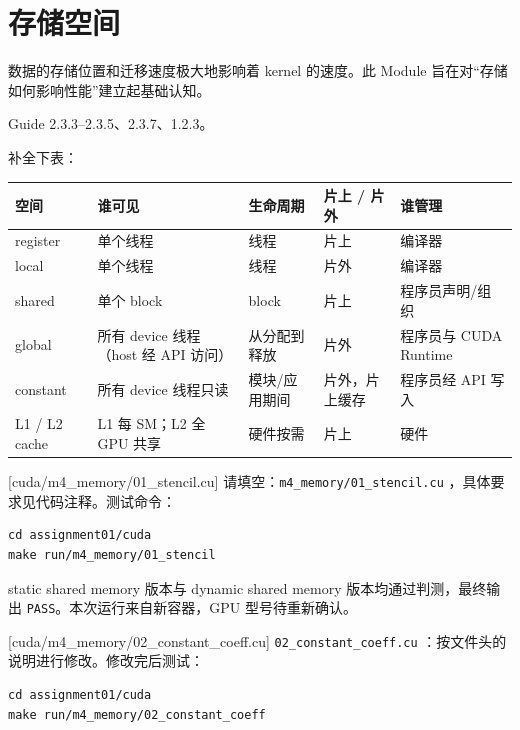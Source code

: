 \documentclass[11pt,a4paper,fontset=none]{ctexart}
\begin{document}
\section{存储空间}

数据的存储位置和迁移速度极大地影响着 kernel 的速度。此 Module 旨在对“存储如何影响性能”建立起基础认知。

\begin{reading}
Guide 2.3.3--2.3.5、2.3.7、1.2.3。
\end{reading}

补全下表：

\begin{center}\small
\begin{tabular}{@{}lp{8em}p{7em}p{6em}p{8em}@{}}
\toprule
空间 & 谁可见 & 生命周期 & 片上 / 片外 & 谁管理 \\
\midrule
register & 单个线程 & 线程 & 片上 & 编译器 \\
local & 单个线程 & 线程 & 片外 & 编译器 \\
shared & 单个 block & block & 片上 & 程序员声明/组织 \\
global & 所有 device 线程（host 经 API 访问） & 从分配到释放 & 片外 & 程序员与 CUDA Runtime \\
constant & 所有 device 线程只读 & 模块/应用期间 & 片外，片上缓存 & 程序员经 API 写入 \\
L1 / L2 cache & L1 每 SM；L2 全 GPU 共享 & 硬件按需 & 片上 & 硬件 \\
\bottomrule
\end{tabular}
\end{center}

[cuda/m4\_memory/01\_stencil.cu]
请填空：\texttt{m4\_memory/01\_stencil.cu} ，具体要求见代码注释。测试命令：

\begin{lstlisting}
cd assignment01/cuda
make run/m4_memory/01_stencil
\end{lstlisting}

\begin{tcolorbox}[title={4.2 判测记录}]
static shared memory 版本与 dynamic shared memory 版本均通过判测，最终输出 \texttt{PASS}。本次运行来自新容器，GPU 型号待重新确认。
\end{tcolorbox}

[cuda/m4\_memory/02\_constant\_coeff.cu]
\texttt{02\_constant\_coeff.cu} ：按文件头的说明进行修改。修改完后测试：

\begin{lstlisting}
cd assignment01/cuda
make run/m4_memory/02_constant_coeff
\end{lstlisting}
\end{document}
